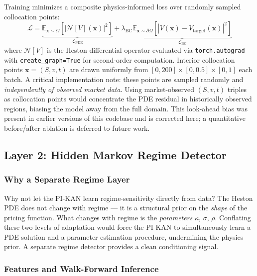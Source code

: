 \documentclass[11pt,a4paper]{article}
\begin{document}
Training minimizes a composite physics-informed loss over randomly sampled collocation
points:
\begin{equation}
\mathcal{L} = \underbrace{\mathbb{E}_{\bm{x} \sim \Omega}\!\left[\left|\mathcal{N}[V](\bm{x})\right|^2\right]}_{\mathcal{L}_\text{PDE}}
+ \lambda_\text{BC}\underbrace{\mathbb{E}_{\bm{x} \sim \partial\Omega}\!\left[\left|V(\bm{x}) - V_\text{target}(\bm{x})\right|^2\right]}_{\mathcal{L}_\text{BC}}
\label{eq:loss}
\end{equation}
where $\mathcal{N}[V]$ is the Heston differential operator evaluated via
\texttt{torch.autograd} with \texttt{create\_graph=True} for second-order computation.
Interior collocation points $\bm{x} = (S,v,t)$ are drawn uniformly from
$[0,200]\times[0,0.5]\times[0,1]$ each batch. A critical implementation note: these
points are sampled randomly and \emph{independently of observed market data}. Using
market-observed $(S,v,t)$ triples as collocation points would concentrate the PDE
residual in historically observed regions, biasing the model away from the full domain.
This look-ahead bias was present in earlier versions of this codebase and is corrected
here; a quantitative before/after ablation is deferred to future work.

\subsection{Layer 2: Hidden Markov Regime Detector}
\label{sec:arch:hmm}

\subsubsection{Why a Separate Regime Layer}

Why not let the PI-KAN learn regime-sensitivity directly from data? The Heston PDE does
not change with regime --- it is a structural prior on the \emph{shape} of the pricing
function. What changes with regime is the \emph{parameters} $\kappa$, $\sigma$, $\rho$.
Conflating these two levels of adaptation would force the PI-KAN to simultaneously
learn a PDE solution and a parameter estimation procedure, undermining the physics prior.
A separate regime detector provides a clean conditioning signal.

\subsubsection{Features and Walk-Forward Inference}
\end{document}

